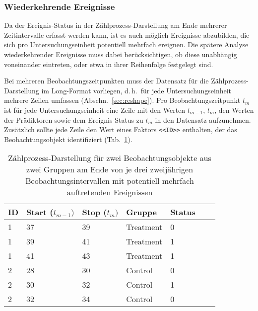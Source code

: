 \subsubsection{Wiederkehrende Ereignisse}

Da der Ereignis-Status in der Zählprozess-Darstellung am Ende mehrerer Zeitintervalle erfasst werden kann, ist es auch möglich Ereignisse abzubilden, die sich pro Untersuchungseinheit potentiell mehrfach ereignen. Die spätere Analyse wiederkehrender Ereignisse muss dabei berücksichtigen, ob diese unabhängig voneinander eintreten, oder etwa in ihrer Reihenfolge festgelegt sind.

Bei mehreren Beobachtungszeitpunkten muss der Datensatz für die Zählprozess-Darstellung im Long-Format vorliegen, d.\,h.\ für jede Untersuchungseinheit mehrere Zeilen umfassen (Abschn.\ \ref{sec:reshape}). Pro Beobachtungszeitpunkt $t_{m}$ ist für jede Untersuchungseinheit eine Zeile mit den Werten $t_{m-1}$, $t_{m}$, den Werten der Prädiktoren sowie dem Ereignis-Status zu $t_{m}$ in den Datensatz aufzunehmen. Zusätzlich sollte jede Zeile den Wert eines Faktors \lstinline!<<ID>>! enthalten, der das Beobachtungsobjekt identifiziert (Tab.\ \ref{tab:survRecur}).

\begin{table}[ht]
\centering
\caption{Zählprozess-Darstellung für zwei Beobachtungsobjekte aus zwei Gruppen am Ende von je drei zweijährigen Beobachtungsintervallen mit potentiell mehrfach auftretenden Ereignissen}
\label{tab:survRecur}
\begin{tabular}{lllllll}
\hline
ID & \sffamily Start ($t_{m-1})$ & \sffamily Stop ($t_{m})$ & \sffamily Gruppe & \sffamily Status\\\hline\hline
 1 & 37      & 39        & Treatment        & 0 \\
 1 & 39      & 41        & Treatment        & 1 \\
 1 & 41      & 43        & Treatment        & 1 \\
 2 & 28      & 30        & Control          & 0 \\
 2 & 30      & 32        & Control          & 1 \\
 2 & 32      & 34        & Control          & 0 \\\hline
\end{tabular}
\end{table}

